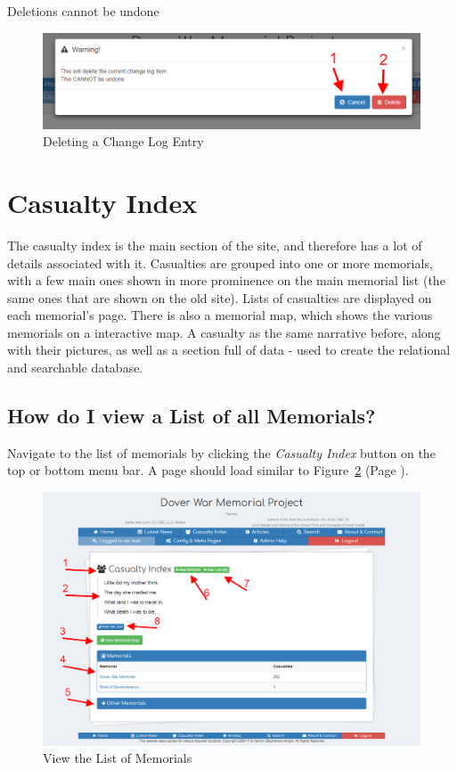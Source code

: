 \documentclass[12pt]{article}
\newcommand{\myref}[1]{\ref{#1} {\scriptsize(Page \pageref{#1})}}
\begin{document}
\begin{warningBox}
Deletions cannot be undone
\end{warningBox}

\begin{figure}[h]
  \centering
 \includegraphics[width=.9\textwidth]{pics/delete_change.png}
	\caption{Deleting a Change Log Entry}\label{fig:delete_change}
\end{figure}

\newpage
\FloatBarrier
\section{Casualty Index}\label{sec:casualtyIndex}

The casualty index is the main section of the site, and therefore has a lot of details associated with it. Casualties are grouped into one or more memorials, with a few main ones shown in more prominence on the main memorial list (the same ones that are shown on the old site). Lists of casualties are displayed on each memorial's page. There is also a memorial map, which shows the various memorials on a interactive map. A casualty as the same narrative before, along with their pictures, as well as a section full of data - used to create the relational and searchable database.

\subsection{How do I view a List of all Memorials?}\label{ssec:view_memorials}
Navigate to the list of memorials by clicking the \textit{Casualty Index} button on the top or bottom menu bar. A page should load similar to Figure~\myref{fig:view_memorials}.

\begin{figure}[h]
  \centering
 \includegraphics[width=.9\textwidth]{pics/view_memorials.png}
	\caption{View the List of Memorials}\label{fig:view_memorials}
\end{figure}
\end{document}

